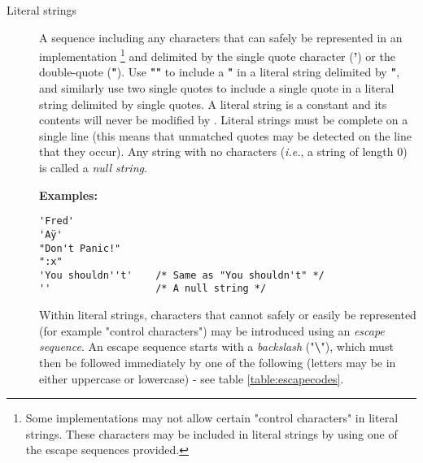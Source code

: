 \begin{description}
\item[Literal strings]\label{refxstr}
\index{,}
\index{,}

A sequence including any characters that can safely be represented in
an implementation
\footnote{
Some implementations may not allow certain "control characters"
in literal strings.
These characters may be included in literal strings by using one of the
escape sequences provided.
}
and delimited by the single quote character (\textbf{'}) or the
double-quote (\textbf{"}).
Use \textbf{""} to include a \textbf{"} in a literal
string delimited by \textbf{"}, and similarly use two single
quotes to include a single quote in a literal string delimited by
single quotes.
A literal string is a constant and its contents will never be modified
by \nr{}.
Literal strings must be complete on a single line (this means that
unmatched quotes may be detected on the line that they occur).
 Any string with no characters (\emph{i.e.}, a string of length 0) is called
a \emph{null string}.
 
\textbf{Examples:}
\begin{lstlisting}
'Fred'
'Aÿ'
"Don't Panic!"
":x"
'You shouldn''t'    /* Same as "You shouldn't" */
''                  /* A null string */
\end{lstlisting}
 
Within literal strings, characters that cannot safely or easily be
represented (for example "control characters") may be introduced
using an \emph{escape sequence}.  An escape sequence starts with a
\emph{backslash} ("\textbf{\textbackslash }"), which must then be
followed immediately by one of the following (letters may be in either
uppercase or lowercase) - see table \ref{table:escapecodes}.


\end{description}
